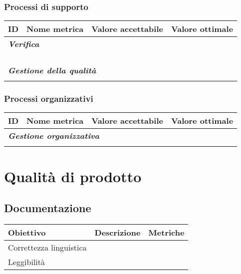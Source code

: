 \documentclass[10pt, a4paper]{article}
\begin{document}
\subsubsection{Processi di supporto}
    {\renewcommand{\arraystretch}{1.5}
    \begin{tabularx}{\textwidth}{p{}|p{}|X|X}
    \textbf{ID} & \textbf{Nome metrica} & \textbf{Valore accettabile} & \textbf{Valore ottimale}  \\
    \hline
    \multicolumn{4}{l}{\cellcolor{primarycolor}\textbf{\textit{Verifica}}} \\
    \hline
     &  &  &  \\
    \hline
     &  &  &  \\
    \hline
     &  &  &  \\
    \hline
     &  &  &  \\
    \hline
    \multicolumn{4}{l}{\cellcolor{primarycolor}\textbf{\textit{Gestione della qualità}}} \\
    \hline
     &  &  &  \\
    \end{tabularx}}    
    
\subsubsection{Processi organizzativi}
    {\renewcommand{\arraystretch}{1.5}
    \begin{tabularx}{\textwidth}{p{}|p{}|X|X}
    \textbf{ID} & \textbf{Nome metrica} & \textbf{Valore accettabile} & \textbf{Valore ottimale}  \\
    \hline
    \multicolumn{4}{l}{\cellcolor{primarycolor}\textbf{\textit{Gestione organizzativa}}} \\
    \hline
     &  &  &  \\
    \end{tabularx}}  

\newpage
\section{Qualità di prodotto}

\subsection{Documentazione}
    {\renewcommand{\arraystretch}{1.5}
    \begin{tabularx}{\textwidth}{p{}|p{}|X}
    \textbf{Obiettivo} & \textbf{Descrizione} & \textbf{Metriche}  \\
    \hline
    Correttezza linguistica &  & \\
    \hline
    Leggibilità &  &  \\
    \end{tabularx}}
    
\end{document}

